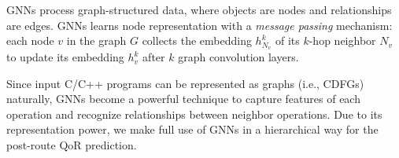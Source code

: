 \documentclass[conference]{IEEEtran}
\begin{document}

GNNs process graph-structured data, where objects are nodes and relationships are edges. GNNs learns node representation with a \emph{message passing} mechanism: each node \( v \) in the graph \( G \) collects the embedding \( h^k_{N_v} \) of its \( k \)-hop neighbor \({N_v}\) to update its embedding \( h^k_v \) after \( k \) graph convolution layers.

Since input C/C++ programs can be represented as graphs (i.e., CDFGs) naturally, GNNs become a powerful technique to capture features of each operation and recognize relationships between neighbor operations. Due to its representation power, we make full use of GNNs in a hierarchical way for the post-route QoR prediction.





\end{document}
